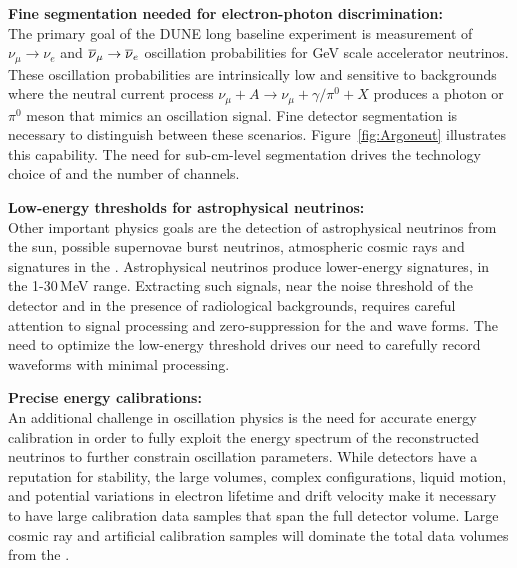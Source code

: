 \documentclass[../main-v1.tex]{subfiles}
\begin{document}
\begin{description}
\item{\bf Fine segmentation needed for electron-photon discrimination: \\}   The primary goal of the DUNE long baseline experiment is measurement of $\nu_\mu\rightarrow\nu_e$ and $\overline{\nu}_\mu\rightarrow\overline{\nu}_e$
oscillation probabilities for GeV scale accelerator neutrinos.   These oscillation probabilities are intrinsically low and sensitive to backgrounds where the neutral current process  $\nu_\mu+A\rightarrow\nu_\mu+\gamma/\pi^0+X$
produces a photon or $\pi^0$ meson that %
mimics an oscillation signal.  Fine detector segmentation is necessary to distinguish between these scenarios. Figure~\ref{fig:Argoneut} illustrates this capability. The need for sub-cm-level segmentation drives the technology choice of  and %
the number of channels.   
\item{\bf Low-energy thresholds for astrophysical neutrinos: \\}
Other important physics goals are the detection of astrophysical neutrinos from the sun, possible supernovae burst neutrinos, atmospheric cosmic rays and %
 signatures in the .  Astrophysical neutrinos produce lower-energy signatures, in the 1-30\,MeV range. Extracting such signals, near the noise threshold of the detector and in the presence of radiological backgrounds, requires careful attention to signal processing and zero-suppression for the   and  wave forms.  The need to optimize the low-energy threshold drives our need to carefully record waveforms with minimal processing. 

\item{\bf Precise energy calibrations:\\}
An additional challenge in oscillation physics is the need for accurate energy calibration in order to fully %
exploit the energy spectrum of the reconstructed neutrinos to further constrain oscillation parameters. While  detectors have a reputation for stability, the large volumes, complex \efield configurations, liquid motion, and potential variations in electron lifetime and drift velocity make it necessary to have large calibration data samples that span the full  detector volume.  Large cosmic ray and artificial calibration samples will dominate the total data volumes from the . 


\end{description}
\end{document}
